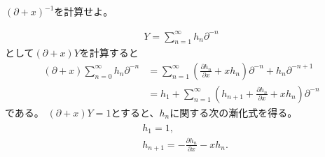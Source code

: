 \documentclass{jsarticle}
\begin{document}
\setcounter{section}{2}

\setcounter{subsection}{2}
\subsection{}
\begin{shaded}
$(\partial+x)^{-1}$を計算せよ。
\end{shaded}
\begin{align}
Y=\sum_{n=1}^{\infty}h_{n}\partial^{-n}
\end{align}
として$(\partial+x)Y$を計算すると
\begin{align*}
(\partial+x)\sum_{n=0}^{\infty}h_n\partial^{-n}
&=\sum_{n=1}^{\infty}\left(\frac{\partial h_{n}}{\partial x}+xh_{n}\right)\partial^{-n}+h_n\partial^{-n+1}\\
&=h_{1}+\sum_{n=1}^{\infty}\left(h_{n+1}+\frac{\partial h_{n}}{\partial x}+xh_{n}\right)\partial^{-n}
\end{align*}
である。
$(\partial+x)Y=1$とすると、$h_{n}$に関する次の漸化式を得る。
\begin{align}
\begin{aligned}
&h_{1}=1,\\
&h_{n+1}=-\frac{\partial h_{n}}{\partial x}-xh_{n}.
\end{aligned}
\end{align}
\setcounter{subsection}{5}
\end{document}
